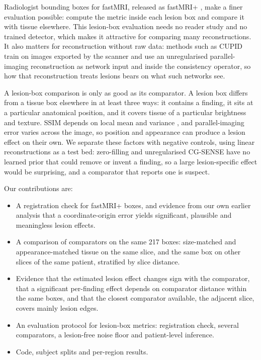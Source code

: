 \documentclass[letterpaper]{article} %
\begin{document}
Radiologist bounding boxes for fastMRI, released as fastMRI+
\citep{zhao2022fastmriplus}, make a finer evaluation possible: compute the
metric inside each lesion box and compare it with tissue elsewhere. This
lesion-box evaluation needs no reader study and no trained detector, which
makes it attractive for comparing many reconstructions. It also matters for
reconstruction without raw data: methods such as CUPID
\citep{alcalar2025cupid} train on images exported by the scanner and use an
unregularised parallel-imaging reconstruction as network input and inside the
consistency operator, so how that reconstruction treats lesions bears on what
such networks see.

A lesion-box comparison is only as good as its comparator. A lesion box
differs from a tissue box elsewhere in at least three ways: it contains a
finding, it sits at a particular anatomical position, and it covers tissue of
a particular brightness and texture. SSIM depends on local mean and variance
\citep{wang2004ssim}, and parallel-imaging error varies across the image, so
position and appearance can produce a lesion effect on their own. We
separate these factors with negative controls, using linear reconstructions
as a test bed: zero-filling and unregularised CG-SENSE have no learned prior
that could remove or invent a finding, so a large lesion-specific effect
would be surprising, and a comparator that reports one is suspect.

Our contributions are:
\begin{itemize}
\item A registration check for fastMRI+ boxes, and evidence from our own
earlier analysis that a coordinate-origin error yields significant,
plausible and meaningless lesion effects.
\item A comparison of comparators on the same 217 boxes: size-matched and
appearance-matched tissue on the same slice, and the same box on other slices
of the same patient, stratified by slice distance.
\item Evidence that the estimated lesion effect changes sign with the
comparator, that a significant per-finding effect depends on comparator
distance within the same boxes, and that the closest comparator available,
the adjacent slice, covers mainly lesion edges.
\item An evaluation protocol for lesion-box metrics: registration check,
several comparators, a lesion-free noise floor and patient-level inference.
\item Code, subject splits and per-region results.
\end{itemize}
\end{document}
